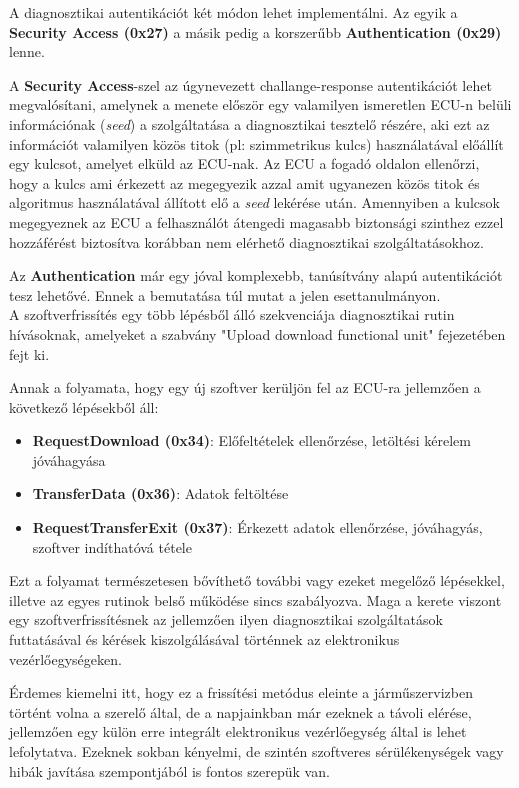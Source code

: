 A diagnosztikai autentikációt két módon lehet implementálni. Az egyik a \textbf{Security Access (0x27)} a másik pedig a korszerűbb \textbf{Authentication (0x29)} lenne. 

A \textbf{Security Access}-szel az úgynevezett challange-response autentikációt lehet megvalósítani, amelynek a menete először egy valamilyen ismeretlen ECU-n belüli információnak (\textit{seed}) a szolgáltatása a diagnosztikai tesztelő részére, aki ezt az információt valamilyen közös titok (pl: szimmetrikus kulcs) használatával előállít egy kulcsot, amelyet elküld az ECU-nak. Az ECU a fogadó oldalon ellenőrzi, hogy a kulcs ami érkezett az megegyezik azzal amit ugyanezen közös titok és algoritmus használatával állított elő a \textit{seed} lekérése után. Amennyiben a kulcsok megegyeznek az ECU a felhasználót átengedi magasabb biztonsági szinthez ezzel hozzáférést biztosítva korábban nem elérhető diagnosztikai szolgáltatásokhoz.

Az \textbf{Authentication} már egy jóval komplexebb, tanúsítvány alapú autentikációt tesz lehetővé. Ennek a bemutatása túl mutat a jelen esettanulmányon.\\

A szoftverfrissítés egy több lépésből álló szekvenciája diagnosztikai rutin hívásoknak, amelyeket a szabvány "Upload download functional unit" fejezetében fejt ki.

Annak a folyamata, hogy egy új szoftver kerüljön fel az ECU-ra jellemzően a következő lépésekből áll:
\begin{itemize}
	\item \textbf{RequestDownload (0x34)}: Előfeltételek ellenőrzése, letöltési kérelem jóváhagyása
	\item \textbf{TransferData (0x36)}: Adatok feltöltése
	\item \textbf{RequestTransferExit (0x37)}: Érkezett adatok ellenőrzése, jóváhagyás, szoftver indíthatóvá tétele
\end{itemize}

Ezt a folyamat természetesen bővíthető további vagy ezeket megelőző lépésekkel, illetve az egyes rutinok belső működése sincs szabályozva. Maga a kerete viszont egy szoftverfrissítésnek az jellemzően ilyen diagnosztikai szolgáltatások futtatásával és kérések kiszolgálásával történnek az elektronikus vezérlőegységeken.

Érdemes kiemelni itt, hogy ez a frissítési metódus eleinte a járműszervizben történt volna a szerelő által, de a napjainkban már ezeknek a távoli elérése, jellemzően egy külön erre integrált elektronikus vezérlőegység által is lehet lefolytatva. Ezeknek sokban kényelmi, de szintén szoftveres sérülékenységek vagy hibák javítása szempontjából is fontos szerepük van.\\

